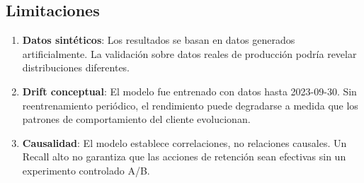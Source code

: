\documentclass[12pt, letterpaper]{article}
\begin{document}
\subsection{Limitaciones}

\begin{enumerate}
  \item \textbf{Datos sintéticos}: Los resultados se basan en datos generados
  artificialmente. La validación sobre datos reales de producción podría
  revelar distribuciones diferentes.

  \item \textbf{Drift conceptual}: El modelo fue entrenado con datos hasta
  2023-09-30. Sin reentrenamiento periódico, el rendimiento puede degradarse
  a medida que los patrones de comportamiento del cliente evolucionan.

  \item \textbf{Causalidad}: El modelo establece correlaciones, no relaciones
  causales. Un Recall alto no garantiza que las acciones de retención sean
  efectivas sin un experimento controlado A/B.
\end{enumerate}

\newpage
\singlespacing


\end{document}
